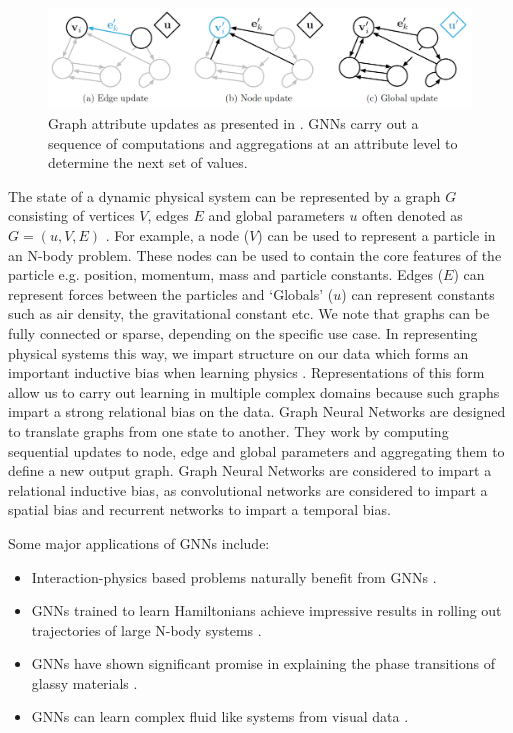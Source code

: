 \documentclass{article}
\begin{document}
\begin{figure}[h]
\centering
\includegraphics[width=\textwidth]{figures/1graph.png}
\caption{Graph attribute updates as presented in \cite{battaglia_relational_2018}. GNNs carry out a sequence of computations and aggregations at an attribute level to determine the next set of values.}
\label{fig:gnn}
\end{figure}
The state of a dynamic physical system can be represented by a graph $G$ consisting of vertices $V$, edges $E$ and global parameters $u$ often denoted as $G = (u,V,E)$ \cite{battaglia_relational_2018}. For example, a node ($V$) can be used to represent a particle in an N-body problem. These nodes can be used to contain the core features of the particle e.g. position, momentum, mass and particle constants. Edges ($E$) can represent forces between the particles and `Globals' ($u$) can represent constants such as air density, the gravitational constant etc. We note that graphs can be fully connected or sparse, depending on the specific use case. In representing physical systems this way, we impart structure on our data which forms an important inductive bias when learning physics \cite{battaglia_interaction_2016, battaglia_relational_2018, sanchez-gonzalez_graph_2018,seo_differentiable_2019,cranmer_learning_2019, seo_physics-aware_2020, sanchez-gonzalez_learning_2020,lamb_graph_2020,cranmer_lagrangian_2020}. Representations of this form allow us to carry out learning in multiple complex domains because such graphs impart a strong relational bias on the data. Graph Neural Networks are designed to translate graphs from one state to another. They work by computing sequential updates to node, edge and global parameters and aggregating them to define a new output graph. Graph Neural Networks are considered to impart a relational inductive bias, as convolutional networks are considered to impart a spatial bias and recurrent networks to impart a temporal bias. 

Some major applications of GNNs include:
\begin{itemize}
\item Interaction-physics based problems naturally benefit from GNNs \cite{battaglia_relational_2018}. 
\item GNNs trained to learn Hamiltonians achieve impressive results in rolling out trajectories of large N-body systems \cite{sanchez-gonzalez_hamiltonian_2019}. 
\item GNNs have shown significant promise in explaining the phase transitions of glassy materials \cite{bapst_unveiling_2020}. 
\item GNNs can learn complex fluid like systems from visual data \cite{sanchez-gonzalez_learning_2020}. 
\end{itemize}
\end{document}
